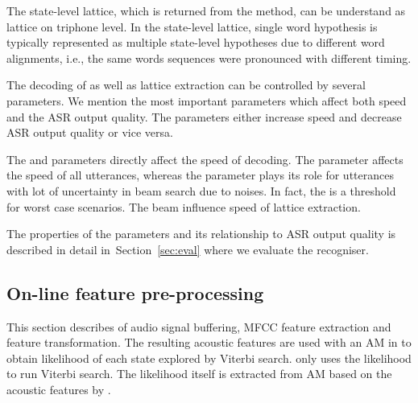 The state-level lattice, which is returned from the  method, can be understand as lattice on triphone level.
In the state-level lattice, single word hypothesis is typically represented as multiple state-level hypotheses due to different word alignments, i.e., the same words sequences were pronounced with different timing.

The decoding of  as well as lattice extraction can be controlled by several parameters.
We mention the most important parameters which affect both speed and the \ac{ASR} output quality. 
The parameters either increase speed and decrease \ac{ASR} output quality or vice versa.

The  and  parameters directly affect the speed of decoding. 
The  parameter affects the speed of all utterances, whereas the  parameter plays its role for utterances with lot of uncertainty in beam search due to noises.
In fact, the  is a threshold for worst case scenarios.
The  beam influence speed of lattice extraction. 

The properties of the parameters and its relationship to \ac{ASR} output quality is described in detail in~Section~\ref{sec:eval} where we evaluate the recogniser. 

\subsection{On-line feature pre-processing} 
\label{sub:preprocess}
This section describes of audio signal buffering, \ac{MFCC} feature extraction and feature transformation. 
The resulting acoustic features are used with an \ac{AM} in  to obtain likelihood of each state explored by Viterbi search.
 only uses the likelihood to run Viterbi search.
The likelihood itself is extracted from \ac{AM} based on the acoustic features by . 

